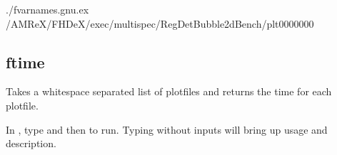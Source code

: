 \documentclass[letterpaper,10pt,english]{sphinxmanual}
\begin{document}
\sphinxAtStartPar
{}

\begin{sphinxVerbatim}[commandchars=\\\{\}]
./fvarnames.gnu.ex 
\PYGZti{}/AMReX/FHDeX/exec/multispec/Reg\PYGZus{}DetBubble\PYGZus{}2d\PYGZus{}Bench/plt0000000
\end{sphinxVerbatim}

\begin{DUlineblock}{0em}
\item[] 
\end{DUlineblock}


\subsection{ftime}
\label{\detokenize{Post_Processing:ftime}}
\sphinxAtStartPar
Takes a whitespace separated list of plotfiles and returns the time
for each plotfile.

\sphinxAtStartPar
{}

\sphinxAtStartPar
In , type  and then  to run.
Typing  without inputs will bring up usage and description.

\sphinxAtStartPar
{}
\end{document}
